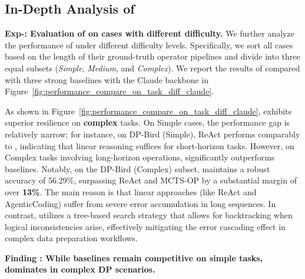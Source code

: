 

\subsection{In-Depth Analysis of \sysp}


% 


\noindent \textbf{Exp-\expnum\label{exp:evaluate_on_various_diff}: Evaluation of \sysp on cases with different difficulty.}
We further analyze the performance of \sysp under different difficulty levels. Specifically, we sort all cases based on the length of their ground-truth operator pipelines and divide into three equal subsets (\textit{Simple}, \textit{Medium}, and \textit{Complex}).
We report the results of \sysp compared with three strong baselines with the Claude backbone in Figure~\ref{fig:performance_compare_on_task_diff_claude}.

As shown in Figure~\ref{fig:performance_compare_on_task_diff_claude}, \sysp exhibits superior resilience on \textbf{complex} tasks.
On {Simple} cases, the performance gap is relatively narrow; for instance, on DP-Bird (Simple), ReAct performs comparably to \sysp, indicating that linear reasoning suffices for short-horizon tasks.
However, on {Complex} tasks involving long-horizon operations, \sysp significantly outperforms baselines. 
Notably, on the {DP-Bird (Complex)} subset, \sysp maintains a robust accuracy of {56.29\%}, surpassing ReAct and MCTS-OP by a substantial margin of over \textbf{13\%}. 
The main reason is that linear approaches (like ReAct and AgenticCoding) suffer from severe error accumulation in long sequences. In contrast, \sysp utilizes a tree-based search strategy that allows for backtracking when logical inconsistencies arise, effectively mitigating the error cascading effect in complex data preparation workflows.

\begin{shaded}
\noindent \textbf{Finding \findingnum: While baselines remain competitive on simple tasks, \sysp dominates in complex DP scenarios.}
\end{shaded}


% 
% 


